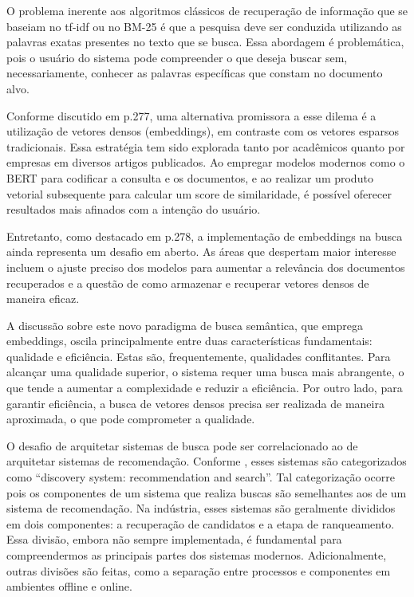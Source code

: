 \documentclass[
	12pt,				%
	openright,			%
	oneside,			%
	a4paper,			%
	english,			%
	french,				%
	spanish,			%
	brazil				%
	]{abntex2}
\begin{document}
O problema inerente aos algoritmos clássicos de recuperação de informação que se baseiam no tf-idf ou no BM-25 é que a
pesquisa deve ser conduzida utilizando as palavras exatas presentes no texto que se busca.
Essa abordagem é problemática, pois o usuário do sistema pode compreender o que deseja buscar sem, necessariamente,
conhecer as palavras específicas que constam no documento alvo.

Conforme discutido em \citeauthor{JurafskyMartin2023} p.277, uma alternativa promissora a esse dilema é a utilização de vetores densos (embeddings),
em contraste com os vetores esparsos tradicionais.
Essa estratégia tem sido explorada tanto por acadêmicos quanto por empresas em diversos artigos publicados.
Ao empregar modelos modernos como o BERT para codificar a consulta e os documentos, e ao realizar um produto vetorial
subsequente para calcular um score de similaridade, é possível oferecer resultados mais afinados com a intenção do usuário.

Entretanto, como destacado em \citeauthor{JurafskyMartin2023} p.278, a implementação de embeddings na busca ainda representa um desafio em aberto.
As áreas que despertam maior interesse incluem o ajuste preciso dos modelos para aumentar a relevância dos documentos
recuperados e a questão de como armazenar e recuperar vetores densos de maneira eficaz.

A discussão sobre este novo paradigma de busca semântica, que emprega embeddings,
oscila principalmente entre duas características fundamentais: qualidade e eficiência.
Estas são, frequentemente, qualidades conflitantes. Para alcançar uma qualidade superior,
o sistema requer uma busca mais abrangente, o que tende a aumentar a complexidade e reduzir a eficiência.
Por outro lado, para garantir eficiência, a busca de vetores densos precisa ser realizada de maneira aproximada,
o que pode comprometer a qualidade.

O desafio de arquitetar sistemas de busca pode ser correlacionado ao de arquitetar sistemas de recomendação.
Conforme \citeauthor{yan2021system}, esses sistemas são categorizados como ``discovery system: recommendation and search''.
Tal categorização ocorre pois os componentes de um sistema que realiza buscas são semelhantes aos de um sistema de
recomendação.
Na indústria, esses sistemas são geralmente divididos em dois componentes: a recuperação de candidatos e a etapa de
ranqueamento.
Essa divisão, embora não sempre implementada, é fundamental para compreendermos as principais partes dos sistemas modernos.
Adicionalmente, outras divisões são feitas, como a separação entre processos e componentes em ambientes offline e online.
\end{document}
